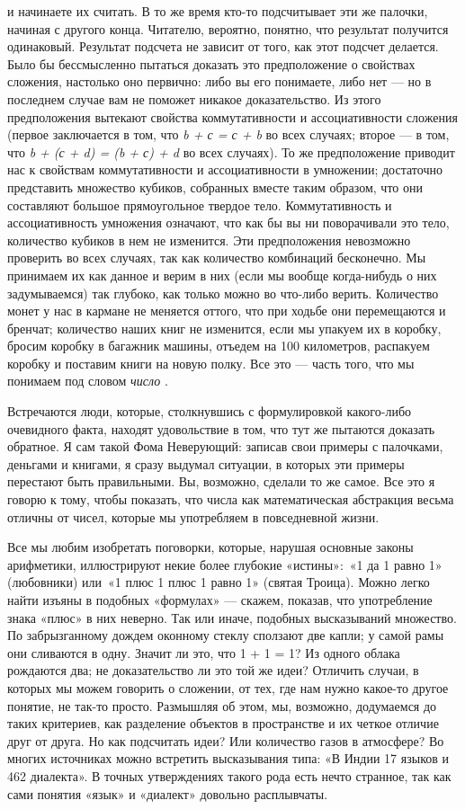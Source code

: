 и начинаете их считать. В то же время кто-то подсчитывает эти же палочки, начиная с другого конца. Читателю, вероятно, понятно, что результат получится одинаковый. Результат подсчета не зависит от того, как этот подсчет делается. Было бы бессмысленно пытаться доказать это предположение о свойствах сложения, настолько оно первично: либо вы его понимаете, либо нет --- но в последнем случае вам не поможет никакое доказательство. Из этого предположения вытекают свойства коммутативности и ассоциативности сложения (первое заключается в том, что \emph{b + с = с + b} во всех случаях; второе --- в том, что \emph{b + (с + d) = (b + с) + d} во всех случаях). То же предположение приводит нас к свойствам коммутативности и ассоциативности в умножении; достаточно представить множество кубиков, собранных вместе таким образом, что они составляют большое прямоугольное твердое тело. Коммутативность и ассоциативность умножения означают, что как бы вы ни поворачивали это тело, количество кубиков в нем не изменится. Эти предположения невозможно проверить во всех случаях, так как количество комбинаций бесконечно. Мы принимаем их как данное и верим в них (если мы вообще когда-нибудь о них задумываемся) так глубоко, как только можно во что-либо верить. Количество монет у нас в кармане не меняется оттого, что при ходьбе они перемещаются и бренчат; количество наших книг не изменится, если мы упакуем их в коробку, бросим коробку в багажник машины, отъедем на 100 километров, распакуем коробку и поставим книги на новую полку. Все это --- часть того, что мы понимаем под словом \emph{число} .

Встречаются люди, которые, столкнувшись с формулировкой какого-либо очевидного факта, находят удовольствие в том, что тут же пытаются доказать обратное. Я сам такой Фома Неверующий: записав свои примеры с палочками, деньгами и книгами, я сразу выдумал ситуации, в которых эти примеры перестают быть правильными. Вы, возможно, сделали то же самое. Все это я говорю к тому, чтобы показать, что числа как математическая абстракция весьма отличны от чисел, которые мы употребляем в повседневной жизни.

Все мы любим изобретать поговорки, которые, нарушая основные законы арифметики, иллюстрируют некие более глубокие «истины»:~«1 да 1 равно 1» (любовники) или~«1 плюс 1 плюс 1 равно 1» (святая Троица). Можно легко найти изъяны в подобных «формулах» --- скажем, показав, что употребление знака «плюс» в них неверно. Так или иначе, подобных высказываний множество. По забрызганному дождем оконному стеклу сползают две капли; у самой рамы они сливаются в одну. Значит ли это, что 1 + 1 = 1? Из одного облака рождаются два; не доказательство ли это той же идеи? Отличить случаи, в которых мы можем говорить о сложении, от тех, где нам нужно какое-то другое понятие, не так-то просто. Размышляя об этом, мы, возможно, додумаемся до таких критериев, как разделение объектов в пространстве и их четкое отличие друг от друга. Но как подсчитать идеи? Или количество газов в атмосфере? Во многих источниках можно встретить высказывания типа: «В Индии 17 языков и 462 диалекта». В точных утверждениях такого рода есть нечто странное, так как сами понятия «язык» и «диалект» довольно расплывчаты.

